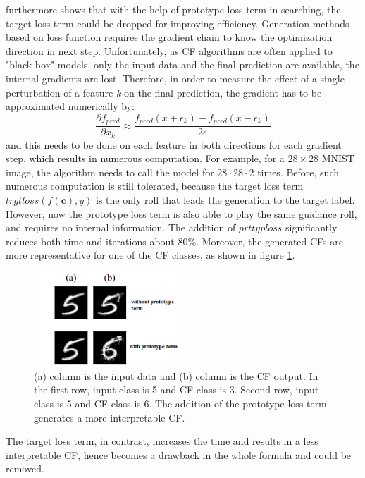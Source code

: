 \cite{prototype} furthermore shows that with the help of prototype loss term in searching, the target loss term could be dropped for improving efficiency. Generation methods based on loss function requires the gradient chain to know the optimization direction in next step. Unfortunately, as CF algorithms are often applied to "black-box" models, only the input data and the final prediction are available, the internal gradients are lost. Therefore, in order to measure the effect of a single perturbation of a feature \emph{k} on the final prediction, the gradient has to be approximated numerically by:
\begin{equation}\label{eq:gradientNumerical}
  \frac{\partial f_{pred}}{\partial x_k}\approx\frac{f_{pred}(x+\epsilon_k)-f_{pred}(x-\epsilon_k)}{2\epsilon}
\end{equation}
and this needs to be done on each feature in both directions for each gradient step, which results in numerous computation. For example, for a $28\times28$ MNIST image, the algorithm needs to call the model for $28\cdot28\cdot2$ times. Before, such numerous computation is still tolerated, because the target loss term ${trgtloss(f(\textbf{c}),y)}$ is the only roll that leads the generation to the target label. However, now the prototype loss term is also able to play the same guidance roll, and requires no internal information. The addition of ${prttyploss}$ significantly reduces both time and iterations about 80\%. Moreover, the generated CFs are more representative for one of the CF classes, as shown in figure \ref{fig:protoresult}. 
\begin{figure}
  \centering
  \includegraphics[width=0.5\textwidth]{proto.PNG}
  \caption{(a) column is the input data and (b) column is the CF output. In the first row, input class is 5 and CF class is 3. Second row, input class is 5 and CF class is 6. The addition of the prototype loss term generates a more interpretable CF.  
  }
  \label{fig:protoresult}
\end{figure}

The target loss term, in contrast, increases the time and results in a less interpretable CF, hence becomes a drawback in the whole formula and could be removed.